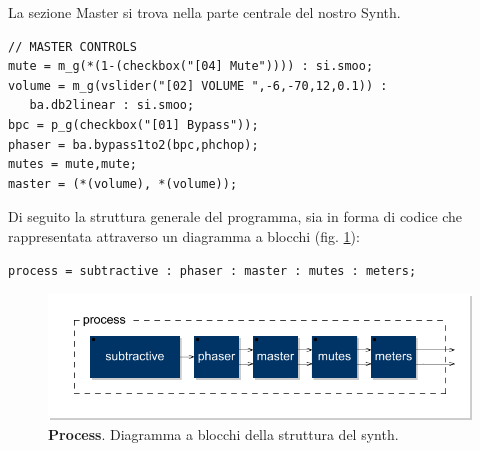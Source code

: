 \documentclass[
	a4paper,
	twocolumn
	]{article}
\begin{document}
La sezione Master si trova nella parte centrale del nostro Synth.

\begin{lstlisting}
// MASTER CONTROLS
mute = m_g(*(1-(checkbox("[04] Mute")))) : si.smoo;
volume = m_g(vslider("[02] VOLUME ",-6,-70,12,0.1)) :
   ba.db2linear : si.smoo;
bpc = p_g(checkbox("[01] Bypass"));
phaser = ba.bypass1to2(bpc,phchop);
mutes = mute,mute;
master = (*(volume), *(volume));
\end{lstlisting}

Di seguito la struttura generale del programma, sia in forma di codice che
rappresentata attraverso un diagramma a blocchi (fig. \ref{process}):

\begin{lstlisting}
process = subtractive : phaser : master : mutes : meters;
\end{lstlisting}

\begin{figure}[h]
\begin{center}
\includegraphics[width=.47\textwidth]{img/process}
\caption{\textbf{Process}. Diagramma a blocchi della struttura del synth.}
\label{process}
\end{center}
\end{figure}



\end{document}
